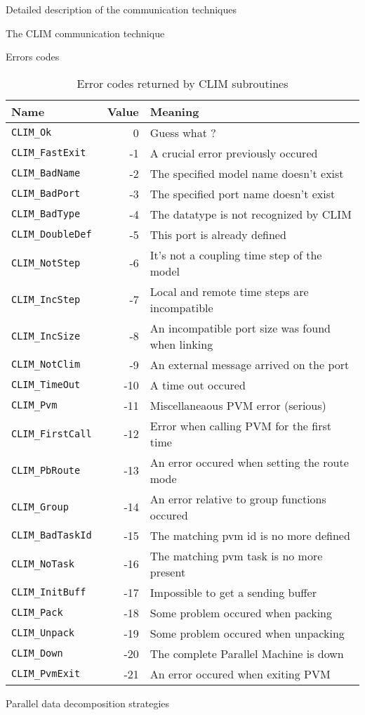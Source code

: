 \begin{section}{Detailed description of the communication techniques}
\begin{subsection}{The CLIM communication technique}
\begin{subsubsection}{Errors codes}
\begin{table}[hbtp]
\begin{center}
\begin{tabular}{|lrl|}
\hline
  Name & Value & Meaning \\
\hline
\hline
{\tt CLIM\_Ok        } & 0 & Guess what ? \\
{\tt CLIM\_FastExit  } & -1 & A crucial error previously occured \\
{\tt CLIM\_BadName   } & -2 & The specified model name doesn't exist \\
{\tt CLIM\_BadPort   } & -3 & The specified port name doesn't exist \\
{\tt CLIM\_BadType   } & -4 & The datatype is not recognized by CLIM \\
{\tt CLIM\_DoubleDef } & -5 & This port is already defined \\
{\tt CLIM\_NotStep   } & -6 & It's not a coupling time step of the model \\
{\tt CLIM\_IncStep   } & -7 & Local and remote time steps are incompatible\\
{\tt CLIM\_IncSize   } & -8 & An incompatible port size was found when linking\\{\tt CLIM\_NotClim   } & -9 & An external message arrived on the port\\
{\tt CLIM\_TimeOut   } & -10 & A time out occured\\
{\tt CLIM\_Pvm       } & -11 & Miscellaneaous PVM error (serious)\\
{\tt CLIM\_FirstCall } & -12 & Error when calling PVM for the first time\\
{\tt CLIM\_PbRoute   } & -13 & An error occured when setting the route mode\\
{\tt CLIM\_Group     } & -14 & An error relative to group functions occured\\
{\tt CLIM\_BadTaskId } & -15 & The matching pvm id is no more defined\\
{\tt CLIM\_NoTask    } & -16 & The matching pvm task is no more present\\
{\tt CLIM\_InitBuff  } & -17 & Impossible to get a sending buffer\\
{\tt CLIM\_Pack      } & -18 & Some problem occured when packing\\
{\tt CLIM\_Unpack    } & -19 & Some problem occured when unpacking\\
{\tt CLIM\_Down      } & -20 & The complete Parallel Machine is down\\
{\tt CLIM\_PvmExit   } & -21 & An error occured when exiting PVM\\
\hline
\end{tabular}
\end{center}
\caption{Error codes returned by CLIM subroutines}
\label{err_codes}
\end{table}
\end{subsubsection}
%
\begin{subsubsection}{Parallel data decomposition strategies}
\label{subsec:clim_para}


\end{subsubsection}
\end{subsection}
\end{section}
